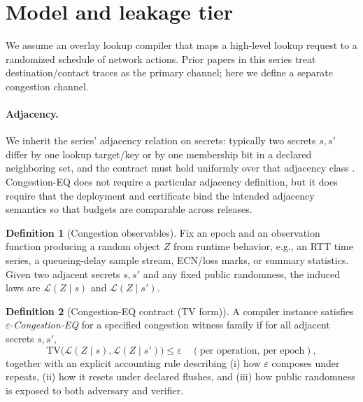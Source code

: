 \documentclass[11pt]{article}
\theoremstyle{definition}
\newtheorem{definition}{Definition}
\theoremstyle{remark}
\newcommand{\TV}{\mathrm{TV}}
\newcommand{\eps}{\varepsilon}
\begin{document}
\section{Model and leakage tier}
We assume an overlay lookup compiler that maps a high-level lookup request to a randomized schedule of network actions.
Prior papers in this series treat destination/contact traces as the primary channel; here we define a separate congestion channel.

\paragraph{Adjacency.}
We inherit the series' adjacency relation on secrets: typically two secrets $s,s'$ differ by one lookup target/key or by one membership bit in a declared neighboring set, and the contract must hold uniformly over that adjacency class \cite{series:schedcompiler}.
Congestion-EQ does not require a particular adjacency definition, but it does require that the deployment and certificate bind the intended adjacency semantics so that budgets are comparable across releases.

\begin{definition}[Congestion observables]
Fix an epoch and an observation function producing a random object $Z$ from runtime behavior, e.g., an RTT time series, a queueing-delay sample stream, ECN/loss marks, or summary statistics.
Given two adjacent secrets $s,s'$ and any fixed public randomness, the induced laws are $\mathcal{L}(Z\mid s)$ and $\mathcal{L}(Z\mid s')$.
\end{definition}

\begin{definition}[Congestion-EQ contract (TV form)]
A compiler instance satisfies \(\eps\)-\emph{Congestion-EQ} for a specified congestion witness family if for all adjacent secrets \(s,s'\),
\[
\TV\big(\mathcal{L}(Z\mid s),\mathcal{L}(Z\mid s')\big) \le \eps\quad (\text{per operation, per epoch}),
\]
\noindent together with an explicit accounting rule describing (i) how \(\eps\) composes under repeats, (ii) how it resets under declared flushes, and (iii) how public randomness is exposed to both adversary and verifier.
\end{definition}
\end{document}
